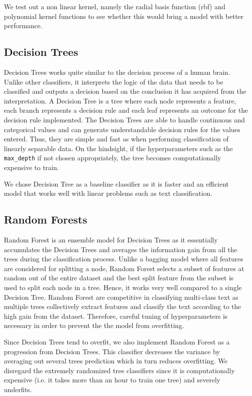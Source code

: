 \documentclass[comsoc,conference]{IEEEtran}
\begin{document}
We test out a non linear kernel, namely the radial basis function (rbf) and polynomial kernel functions to see whether this would bring a model with better performance. 

\subsection{Decision Trees}

Decision Trees works quite similar to the decision process of a human brain. Unlike other classifiers, it interprets the logic of the data that needs to be classified and outputs a decision based on the conclusion it has acquired from the interpretation. A Decision Tree is a tree where each node represents a feature, each branch represents a decision rule and each leaf represents an outcome for the decision rule implemented. \cite{DT1} The Decision Trees are able to handle continuous and categorical values and can generate understandable decision rules for the values entered. Thus, they are simple and fast as when performing classification of linearly separable data. On the hindsight, if the hyperparameters such as the \texttt{max\_depth} if not chosen appropriately, the tree becomes computationally expensive to train. 

We chose Decision Tree as a baseline classifier as it is faster and an efficient model that works well with linear problems such as text classification.

\subsection{Random Forests}

Random Forest is an ensemble model for Decision Trees as it essentially accumulates the Decision Trees and averages the information gain from all the trees during the classification process. Unlike a bagging model where all features are considered for splitting a node, Random Forest selects a subset of features at random out of the entire dataset and the best split feature from the subset is used to split each node in a tree. Hence, it works very well compared to a single Decision Tree. Random Forest are competitive in classifying multi-class text as multiple trees collectively extract features and classify the text according to the high gain from the dataset. Therefore, careful tuning of hyperparameters is necessary in order to prevent the the model from overfitting. 

Since Decision Trees tend to overfit, we also implement Random Forest as a progression from Decision Trees. This classifier decreases the variance by averaging out several trees prediction which in turn reduces overfitting. We disregard the extremely randomized tree classifiers since it is computationally expensive (i.e. it takes more than an hour to train one tree) and severely underfits.
\end{document}
